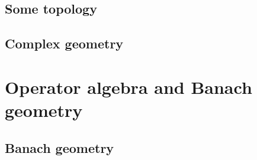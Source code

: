             
            
            

        \begin{appendices}
            \chapter{Some topology}
                \begin{abstract}
                    
                \end{abstract}
                
                \minitoc
                
                
                
                
                
            \chapter{Complex geometry}
                \begin{abstract}
                    
                \end{abstract}
                
                \minitoc
                
                
                
                
        \end{appendices}

    \part{Operator algebra and Banach geometry}
        \chapter{Banach geometry}
            \begin{abstract}
                
            \end{abstract}
            
